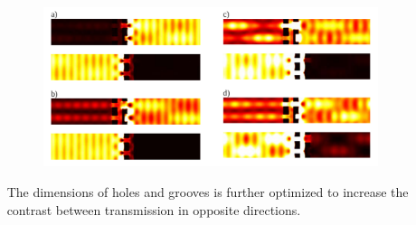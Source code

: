\documentclass{beamer}
\begin{document}
\begin{frame}
\begin{columns}
\begin{column}{0.5\textwidth}
\begin{figure}[htb]
			\end{figure}
		\end{column}
		\begin{column}{0.5\textwidth}
			\begin{figure}[htb]
				\includegraphics[width=\textwidth]{../images/dmg/kontrast_energy.png}\\
			\end{figure}
			The dimensions of holes and grooves is further optimized to increase the contrast between transmission in opposite directions.
			
		\end{column}
	\end{columns}
		
\end{frame}
\end{document}
